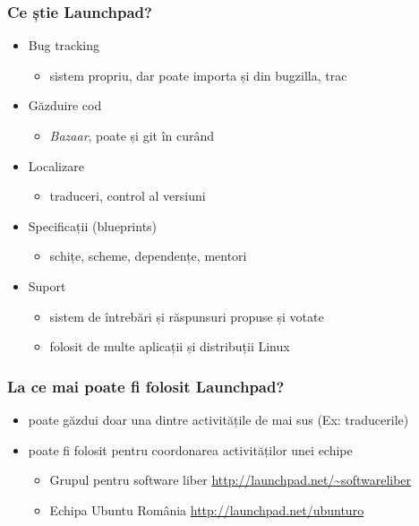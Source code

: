 \documentclass{beamer}
\begin{document}
\begin{frame}
\frametitle{Ce știe Launchpad?}
\begin{itemize}
\pause \item Bug tracking
\begin{itemize}
\item sistem propriu, dar poate importa și din bugzilla, trac
\end{itemize}
\pause \item Găzduire cod 
\begin{itemize}
\item	\emph{Bazaar}, poate și git în curând
\end{itemize}
\pause \item Localizare
\begin{itemize}
\item traduceri, control al versiuni
\end{itemize}
\pause \item Specificații (blueprints)
\begin{itemize}
\item schițe, scheme, dependențe, mentori
\end{itemize}
\pause \item Suport
\begin{itemize}
\item sistem de întrebări și răspunsuri propuse și votate
\newline
\item folosit de multe aplicații și distribuții Linux %
\end{itemize}
\end{itemize}
\end{frame}

\begin{frame}
\frametitle{La ce mai poate fi folosit Launchpad?}
\begin{itemize}
\item poate găzdui doar una dintre activitățile de mai sus (Ex: traducerile)
\item poate fi folosit pentru coordonarea activităților unei echipe
\begin{itemize}
\item Grupul pentru software liber \url{http://launchpad.net/~softwareliber}
\item Echipa Ubuntu România \url{http://launchpad.net/ubunturo}
\end{itemize}
\end{itemize}
\end{frame}
\end{document}
